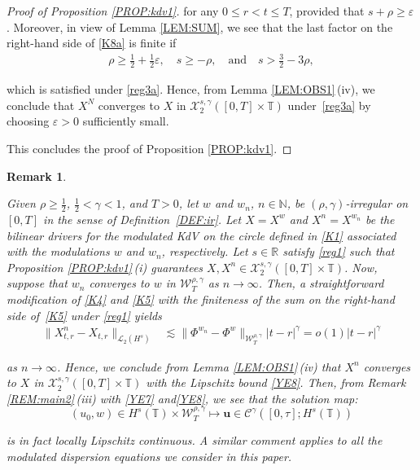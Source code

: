 \documentclass[letterpaper, 11pt,  reqno]{amsart}
\newtheorem{remark}[theorem]{Remark}
\newcommand{\1}{\hspace{0.5mm}\text{I}\hspace{0.5mm}}
\newcommand{\noi}{\noindent}
\newcommand{\R}{\mathbb{R}}
\newcommand{\T}{\mathbb{T}}
\newcommand{\eps}{\varepsilon}
\newcommand{\g}{\gamma}
\newcommand{\les}{\lesssim}
\newcommand{\N}{\mathbb{N}}
\newcommand{\cL}{\mathcal{L}}
\newcommand{\cC}{\mathcal{C}}
\newcommand{\cX}{\mathcal{X}}
\newcommand{\W}{\mathcal{W}}
\newcommand{\uu}{\mathbf{u}}
\numberwithin{equation}{section}
\numberwithin{theorem}{section}
\begin{document}
\begin{proof}[Proof of Proposition \ref{PROP:kdv1}]
\noi
for any $0 \le r <  t \le T$, 
provided that 
 $s + \rho \ge \eps$.
Moreover, 
in view of Lemma \ref{LEM:SUM}, 
we see that the last factor on the right-hand side of \eqref{K8a}
is finite if 
 \begin{align*}
\rho \ge \frac 12 + \frac 12\eps, \quad s \ge - \rho,
\quad \text{and}\quad 
s > \frac 32 - 3 \rho, 
 \end{align*}




\noi
which is satisfied under  \eqref{reg3a}.
Hence,
from  Lemma \ref{LEM:OBS1}\,(iv),  
we conclude that 
$X^N$ converges to $X$ in 
 $  \cX^{s, \g}_2([0, T]\times \T)$ under~\eqref{reg3a}
 by choosing $\eps > 0$ sufficiently small.

This concludes the proof of Proposition \ref{PROP:kdv1}.
\end{proof}




\begin{remark}\label{REM:conv1} \rm

Given $\rho \ge\frac 12$,  $\frac12< \g < 1$, and $T> 0$, 
let  $w$ and $w_n$, $n \in \N$,  be $(\rho,\g)$-irregular on $[0, T]$ in the sense of Definition~\ref{DEF:ir}.
Let $X = X^w$ and $X^n = X^{w_n}$ be 
the   bilinear drivers 
for the modulated KdV on the circle
defined in \eqref{K1}
associated with the modulations $w$ and $w_n$, respectively.
Let  $s \in \R$
satisfy 
\eqref{reg1}
such that Proposition \ref{PROP:kdv1}\,(i) guarantees
$X, X^n \in  \cX^{s, \g}_2([0, T]\times \T)$.
Now,  suppose that $w_n$ converges to $w$ in 
$\W^{\rho,\g}_T$ as $n \to \infty$.
Then, a straightforward  modification of 
\eqref{K4} and \eqref{K5} with the finiteness of the sum
on the right-hand side of~\eqref{K5}
under \eqref{reg1} yields
\begin{align}
\|X^n_{t,r} - X_{t,r} \|_{\cL_2 (H^s)}
&\les
 \| \Phi^{w_n} - \Phi^w \|_{\W_T^{\rho,\g}} 
  |t-r|^{\g}
  = o(1)   |t-r|^{\g}
\label{YE8}
\end{align}

\noi
as $n \to \infty$.
Hence, we conclude from Lemma \ref{LEM:OBS1}\,(iv)
that 
 $X^n$ converges to $X$ 
in $ \cX^{s, \g}_2([0, T] \times \T)$
with the Lipschitz bound \eqref{YE8}.
Then, from Remark \ref{REM:main2}\,(iii)
with \eqref{YE7} and\eqref{YE8}, 
we see that the solution map:
 \[(u_0, w) \in H^s(\T) 
\times  \W^{\rho,\g}_T \longmapsto \uu \in \cC^\g([0, \tau]; H^s(\T))\]

\noi
is in fact locally Lipschitz continuous.
 A similar comment applies
to all the modulated dispersion equations
we consider in this paper.










\end{remark}
\end{document}
